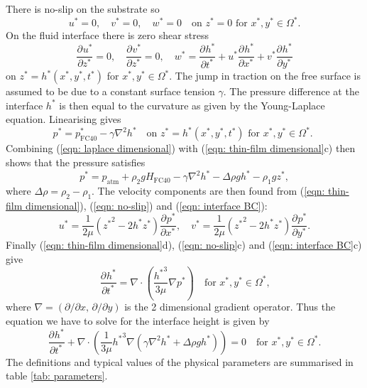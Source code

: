 \documentclass{jfm}
\newcommand{\pD}[3]{\frac{ \partial^{#3} {#1} }{ \partial {#2}^{#3} }}
\begin{document}
There is no-slip on the substrate so 
 \label{eqn: no-slip}
\begin{equation}
{u^*}=0,\quad {v^*}=0,\quad {w^*}=0 \quad \text{on ${z^*}=0$ for ${x^*}, {y^*} \in \Omega^*$.} \tag{\theequation a--c}
\end{equation}
On the fluid interface there is zero shear stress 
 \label{eqn: interface BC}
\begin{equation} 
\pD{{u^*}}{{z^*}}{}=0, \quad \pD{{v^*}}{{z^*}}{}=0,   \quad {w^*} = \pD{{h^*}}{{t^*}}{}+ {u^*}\pD{{h^*}}{{x^*}}{} + {v^*} \pD{{h^*}}{{y^*}}{} \tag{\theequation a--c}
\end{equation}
on ${z^*}={h^*}({x^*},{y^*},{t^*})$ for ${x^*}, {y^*} \in \Omega^*$. 
The jump in traction on the free surface is assumed to be due to a constant surface tension $\gamma$. 
The pressure difference at the interface $h^*$  is then equal to the curvature as given by the Young-Laplace equation.
Linearising gives  
\begin{equation}
{p^*} = p^*_{\text{FC40}}   - \gamma \nabla^2 {h^*}  \quad \text{on ${z^*}={h^*}({x^*},{y^*},{t^*})$ for ${x^*}, {y^*} \in \Omega^*$. } \label{eqn: laplace dimensional}
\end{equation}
Combining (\ref{eqn: laplace dimensional}) with (\ref{eqn: thin-film dimensional}c)   then shows that the pressure satisfies  
\begin{equation}
{p^*} =  p_{\text{atm}} +\rho_2 g H_{\text{FC40}} - \gamma \nabla^2 {h^*} - \Delta \rho g {h^*}  - \rho_1g   {z^*} ,
\end{equation}   
where $ \Delta \rho = \rho_2-\rho_1$. 
The velocity components are then found from (\ref{eqn: thin-film dimensional}), (\ref{eqn: no-slip}) and (\ref{eqn: interface BC}): 
  \label{eqn: velocity dimensional}
\begin{equation}
{u^*} = \frac{1}{2 \mu}\left( {{z^*}}^2  - 2  {h^*} {z^*} \right) \pD{{p^*}}{{x^*}}{}, \quad  {v^*} = \frac{1}{2\mu}\left( {{z^*}}^2  - 2 {h^*} {z^*} \right) \pD{{p^*}}{{y^*}}{} .  \tag{\theequation a,b}
\end{equation}
Finally (\ref{eqn: thin-film dimensional}d), (\ref{eqn: no-slip}c) and (\ref{eqn: interface BC}c) give
\begin{equation}
\pD{{h^*}}{{t^*}}{} = \nabla \cdot \left(\frac{{h^*}^3}{3 \mu } \nabla {p^*} \right)\quad \text{for ${x^*},{y^*} \in \Omega^*$,}  \label{eqn: lubrication dimensional}
\end{equation}
where $\nabla = \left(\partial / \partial x, \, \partial / \partial y  \right)$ is the 2 dimensional gradient operator.
Thus the equation we have to solve for the interface height is given by 
\begin{equation}
 \pD{{h^*}}{{t^*}}{} + \nabla \cdot \left(\frac{1}{3 \mu} {{h^*}}^3 \nabla\left(\gamma \nabla^2 {h^*} + \Delta \rho g {h^*}  \right)\right)=0  \quad \text{for ${x^*},{y^*} \in \Omega^*$.}  \label{eqn: full interface}
\end{equation}
The definitions  and typical values of the  physical parameters  are summarised in table \ref{tab: parameters}. 
 
\end{document}
